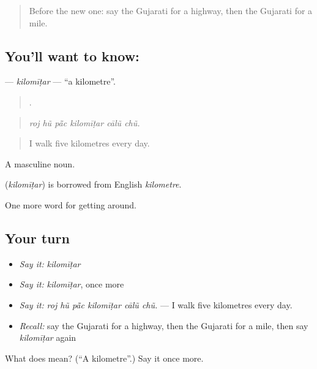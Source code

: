 \begin{quote}
Before the new one: say the Gujarati for a highway, then the Gujarati for a mile.
\end{quote}

\subsection*{You'll want to know: }
\textbf{} — \emph{kilomīṭar} — \textquotedblleft{}a kilometre\textquotedblright{}.

\begin{quote}
     .
\end{quote}

\begin{quote}
\emph{roj hũ pā̃c kilomīṭar cālũ chũ.}
\end{quote}

\begin{quote}
I walk five kilometres every day.
\end{quote}

A masculine noun.

\begin{cousinweb}
\textbf{} (\emph{kilomīṭar}) is borrowed from English \emph{kilometre}.
\end{cousinweb}

\begin{grammarlens}[title={What you've built}]
One more word for getting around.
\end{grammarlens}

\subsection*{Your turn}
\begin{itemize}
\raggedright
  \item \emph{Say it:} \emph{kilomīṭar}
  \item \emph{Say it:} \emph{kilomīṭar}, once more
  \item \emph{Say it:} \emph{roj hũ pā̃c kilomīṭar cālũ chũ.} — I walk five kilometres every day.
  \item \emph{Recall:} say the Gujarati for a highway, then the Gujarati for a mile, then say \emph{kilomīṭar} again
\end{itemize}

\begin{tcolorbox}[breakable,colback=teal!4,colframe=teal!35!black,title={Before you move on}]
What does  mean? (\textquotedblleft{}A kilometre\textquotedblright{}.) Say it once more.
\end{tcolorbox}
